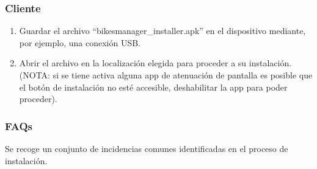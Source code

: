 \subsubsection{Cliente}

\begin{enumerate}
	\item Guardar el archivo “bikesmanager\_installer.apk” en el dispositivo mediante, por ejemplo, una conexión USB.
	\item Abrir el archivo en la localización elegida para proceder a su instalación. (NOTA: si se tiene activa alguna app de atenuación de pantalla es posible que el botón de instalación no esté accesible, deshabilitar la app para poder proceder).
\end{enumerate}

\subsubsection{FAQs}

Se recoge un conjunto de incidencias comunes identificadas en el proceso de instalación.

